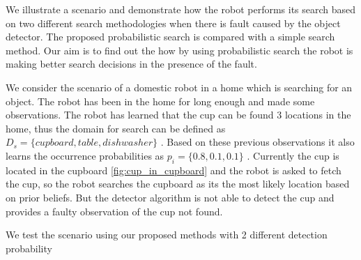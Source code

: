 We illustrate a scenario and demonstrate how the robot performs its search based on two different search methodologies when there is fault caused by the object detector. The proposed probabilistic search is compared with a simple search method. Our aim is to find out the how by using probabilistic search the robot is making better search decisions in the presence of the fault.

We consider the scenario of a domestic robot in a home which is searching for an object. The robot has been in the home for long enough and made some observations. The robot has learned that the cup can be found 3 locations in the home, thus the domain for search can be defined as $D_s = \{cupboard, table, dishwasher \}$ . Based on these previous observations it also learns the occurrence probabilities as $p_i = \{ 0.8, 0.1, 0.1\}$ . Currently the cup is located in the cupboard \ref{fig:cup_in_cupboard} and the robot is asked to fetch the cup, so the robot searches the cupboard as its the most likely location based on prior beliefs. But the detector algorithm is not able to detect the cup and provides a faulty observation of the cup not found. 

We test the scenario using our proposed methods with 2 different detection probability




